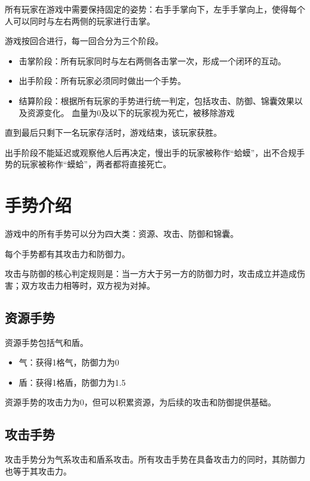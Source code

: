\documentclass[12pt]{ctexart}
\begin{document}
所有玩家在游戏中需要保持固定的姿势：右手手掌向下，左手手掌向上，使得每个人可以同时与左右两侧的玩家进行击掌。

游戏按回合进行，每一回合分为三个阶段。

\begin{itemize}
    \item 击掌阶段：所有玩家同时与左右两侧各击掌一次，形成一个闭环的互动。
    \item 出手阶段：所有玩家必须同时做出一个手势。
    \item 结算阶段：根据所有玩家的手势进行统一判定，包括攻击、防御、锦囊效果以及资源变化。
    血量为0及以下的玩家视为死亡，被移除游戏
\end{itemize}

直到最后只剩下一名玩家存活时，游戏结束，该玩家获胜。

出手阶段不能延迟或观察他人后再决定，慢出手的玩家被称作“蛤蟆”，出不合规手势的玩家被称作“蟆蛤”，两者都将直接死亡。

\section{手势介绍}

游戏中的所有手势可以分为四大类：资源、攻击、防御和锦囊。

每个手势都有其攻击力和防御力。

攻击与防御的核心判定规则是：当一方大于另一方的防御力时，攻击成立并造成伤害；双方攻击力相等时，双方视为对掉。

\subsection{资源手势}

资源手势包括气和盾。

\begin{itemize}
    \item 气：获得1格气，防御力为0
    \item 盾：获得1格盾，防御力为1.5
\end{itemize}

资源手势的攻击力为0，但可以积累资源，为后续的攻击和防御提供基础。

\subsection{攻击手势}

攻击手势分为气系攻击和盾系攻击。所有攻击手势在具备攻击力的同时，其防御力也等于其攻击力。
\end{document}
